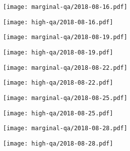 \documentclass{article}
\begin{document}
\begin{figure}[H]
	\ContinuedFloat
	\centering
	\begin{subfigure}{0.48\linewidth}
		\texttt{[image: marginal-qa/2018-08-16.pdf]}
	\end{subfigure}
	\begin{subfigure}{0.48\linewidth}
		\texttt{[image: high-qa/2018-08-16.pdf]}
	\end{subfigure}
	\begin{subfigure}{0.48\linewidth}
		\texttt{[image: marginal-qa/2018-08-19.pdf]}
	\end{subfigure}
	\begin{subfigure}{0.48\linewidth}
		\texttt{[image: high-qa/2018-08-19.pdf]}
	\end{subfigure}
	\begin{subfigure}{0.48\linewidth}
		\texttt{[image: marginal-qa/2018-08-22.pdf]}
	\end{subfigure}
	\begin{subfigure}{0.48\linewidth}
		\texttt{[image: high-qa/2018-08-22.pdf]}
	\end{subfigure}
	\begin{subfigure}{0.48\linewidth}
		\texttt{[image: marginal-qa/2018-08-25.pdf]}
	\end{subfigure}
	\begin{subfigure}{0.48\linewidth}
		\texttt{[image: high-qa/2018-08-25.pdf]}
	\end{subfigure}
	\begin{subfigure}{0.48\linewidth}
		\texttt{[image: marginal-qa/2018-08-28.pdf]}
	\end{subfigure}
	\begin{subfigure}{0.48\linewidth}
		\texttt{[image: high-qa/2018-08-28.pdf]}
	\end{subfigure}
\end{figure}
\end{document}
